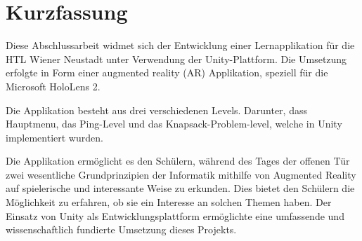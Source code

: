 \chapter{Kurzfassung}
Diese Abschlussarbeit widmet sich der Entwicklung einer Lernapplikation für die HTL Wiener Neustadt unter Verwendung
der Unity-Plattform. Die Umsetzung erfolgte in Form einer augmented reality (AR) Applikation, speziell für die
Microsoft HoloLens 2.

Die Applikation besteht aus drei verschiedenen Levels. Darunter, dass Hauptmenu, das Ping-Level und das Knapsack-Problem-level,
welche in Unity implementiert wurden.

Die Applikation ermöglicht es den Schülern, während des Tages der offenen Tür zwei wesentliche Grundprinzipien der
Informatik mithilfe von Augmented Reality auf spielerische und interessante Weise zu erkunden. Dies bietet den
Schülern die Möglichkeit zu erfahren, ob sie ein Interesse an solchen Themen haben. Der Einsatz von Unity als
Entwicklungsplattform ermöglichte eine umfassende und wissenschaftlich fundierte Umsetzung dieses Projekts.


